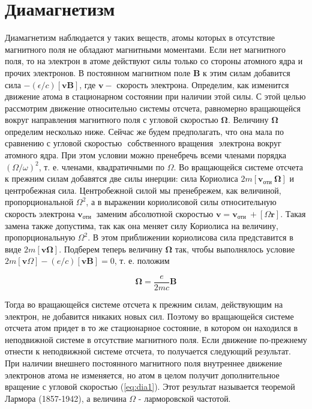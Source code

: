 \documentclass[12pt]{article}
\begin{document}
  \section{Диамагнетизм}
  Диамагнетизм наблюдается у таких веществ, атомы которых в отсутствие магнитного поля не обладают магнитными моментами. Если нет магнитного поля, то на электрон в атоме действуют силы только со стороны атомного ядра и прочих электронов. В постоянном магнитном поле $\mathbf{B}$ к этим силам добавится сила $-(\epsilon / c)[\mathbf{v B}]$, где $\mathbf{v}-$ скорость электрона. Определим, как изменится движение атома в стационарном состоянии при наличии этой силы. С этой целью рассмотрим движение относительно системы отсчета, равномерно вращающейся
  вокруг направления магнитного поля с угловой скоростью $\boldsymbol{\Omega}$. Величину $\boldsymbol{\Omega}$ определим несколько ниже. Сейчас же будем предполагать, что она мала по сравнению с угловой скоростью $\boldsymbol{\text { собственного вращения }}$ электрона вокруг атомного ядра. При этом условии можно пренебречь всеми членами порядка $(\Omega / \omega)^2$, т. е. членами, квадратичными по $\Omega$. Во вращающейся системе отсчета к прежним силам добавятся две силы инерции: сила Кориолиса $2 m\left[\mathbf{v}_{\text {оти }} \boldsymbol{\Omega}\right]$ и центробежная сила. Центробежной силой мы пренебрежем, как величиной, пропорциональной $\Omega^2$, а в выражении кориолисовой силы относительную скорость электрона $\mathbf{v}_{\text {оти }}$ заменим абсолютной скоростью $\mathbf{v}=\mathbf{v}_{\text {оти }}+[\Omega \mathbf{r}]$. Такая замена также допустима, так как она меняет силу Кориолиса на величину, пропорциональную $\Omega^2$. В этом приближении кориолисова сила представится в виде $2 m[\mathbf{v} \boldsymbol{\Omega}]$. Подберем теперь величину $\boldsymbol{\Omega}$ так, чтобы выполнялось условие $2 m[\mathbf{v} \Omega]-(e / c)[\mathbf{v B}]=0$, т. е. положим

  \begin{equation}
  \label{eq:dia1}
  \boldsymbol{\Omega}=\frac{e}{2 m c} \mathbf{B}
  \end{equation}

  Тогда во вращающейся системе отсчета к прежним силам, действующим на электрон, не добавится никаких новых сил. Поэтому во вращающейся системе отсчета атом придет в то же стационарное состояние, в котором он находился в неподвижной системе в отсутствие магнитного поля. Если движение по-прежнему отнести к неподвижной системе отсчета, то получается следующий результат. При наличии внешнего постоянного магнитного поля внутреннее движение электронов атома не изменяется, но атом в целом получит дополнительное вращение с угловой скоростью (\ref{eq:dia1}). Этот результат называется теоремой Лармора (1857-1942), а величина $\Omega$ - ларморовской частотой.
\end{document}

